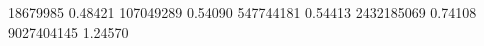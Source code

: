 18679985   0.48421 %
107049289  0.54090 %
547744181  0.54413 %
2432185069 0.74108 %
9027404145 1.24570 %
